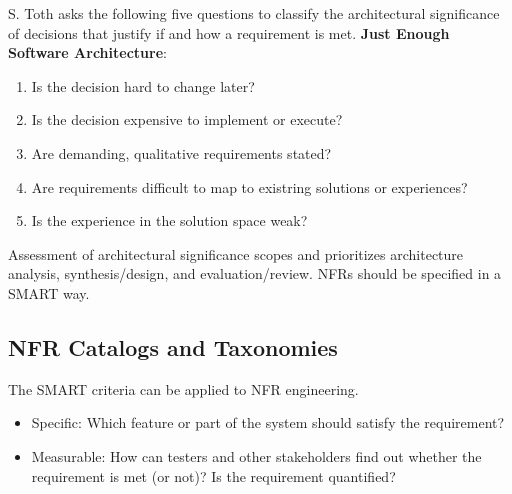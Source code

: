 \documentclass[../Main.tex]{subfiles}
\begin{document}
S. Toth asks the following five questions to classify the architectural significance of decisions that justify if and
how a requirement is met.
\textbf{Just Enough Software Architecture}:
\begin{enumerate}
    \item Is the decision hard to change later?
    \item Is the decision expensive to implement or execute?
    \item Are demanding, qualitative requirements stated?
    \item Are requirements difficult to map to existring solutions or experiences?
    \item Is the experience in the solution space weak?
\end{enumerate}

Assessment of architectural significance scopes and prioritizes architecture analysis, 
synthesis/design, and evaluation/review. NFRs should be specified in a SMART way.

\subsection{NFR Catalogs and Taxonomies}


The SMART criteria can be applied to NFR engineering.
\begin{itemize}
    \item Specific: Which feature or part of the system should satisfy the requirement?
    \item Measurable: How can testers and other stakeholders find out whether the requirement is met (or not)? Is the requirement quantified?
\end{itemize}
\end{document}
